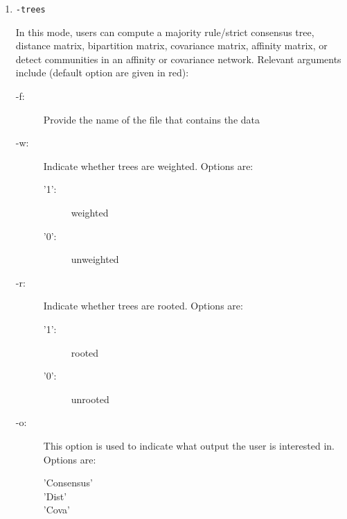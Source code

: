 \documentclass[11pt]{article}
\begin{document}
\begin{enumerate}[{\bf (1)}]
\item {\tt -trees} 

In this mode, users can compute a majority rule/strict consensus tree, distance matrix,
bipartition matrix, covariance matrix, affinity matrix, or detect communities in an affinity or
covariance network. Relevant arguments include (default option are given in red):
	\begin{description}
	\item[-f:] Provide the name of the file that contains the data

	
	\item[-w:] Indicate whether trees are weighted. Options are:
		\begin{description}
		\item['1':] weighted
		\item['0':] unweighted
		\end{description}
	
	\item[-r:] Indicate whether trees are rooted. Options are:
		\begin{description}
		\item['1':] rooted
		\item['0':] unrooted
		\end{description}
	
	\item[-o:] This option is used to indicate what output the user is interested in. Options are:
		\begin{description}
			\item['Consensus']
			\item['Dist']
			\item['Cova']
		\end{description}


\end{description}
\end{enumerate}
\end{document}
